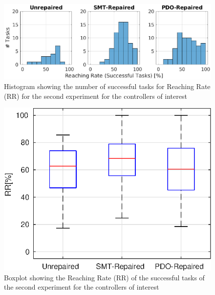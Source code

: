 \begin{figure}[H]
    \centering
    \includegraphics[width=\textwidth]{Images/second-experiment/exp1_RR_succ_hist.eps}
    \caption{Histogram showing the number of successful tasks for Reaching Rate (RR) for the second experiment for the controllers of interest}
    \label{fig:hist-RR-succ-second}
\end{figure}
\begin{figure}[H]
    \centering
    \includegraphics[width=\textwidth]{Images/second-experiment/exp1_RR_succ_box.eps}
    \caption{Boxplot showing the Reaching Rate (RR) of the successful tasks of the second experiment for the controllers of interest}
    \label{fig:box-RR-succ-second}
\end{figure}
%
%
